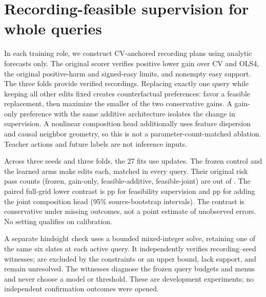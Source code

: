 \section{Recording-feasible supervision for whole queries}
In each training role, we construct CV-anchored recording plans using
analytic forecasts only. The original scorer verifies positive lower
gain over CV and OLS4, the original positive-harm and signed-easy
limits, and nonempty easy support. The three folds provide
\SlateWitnessWitnesses{} verified recordings. Replacing exactly one
query while keeping all other edits fixed creates counterfactual
preferences: favor a feasible replacement, then maximize the smaller
of the two conservative gains. A gain-only preference with the same
additive architecture isolates the change in supervision. A nonlinear
composition head additionally uses feature dispersion and causal
neighbor geometry, so this is not a parameter-count-matched ablation.
Teacher actions and future labels are not inference inputs.

Across three seeds and three folds, the 27 fits use
\SlateWitnessUpdates{} updates. The frozen control and the learned arms
make \SlateWitnessEdits{} edits each, matched in every query. Their
original risk pass counts (frozen, gain-only, feasible-additive,
feasible-joint) are \SlateWitnessPasses{} out of \SlateWitnessViews{}.
The paired full-grid lower contrast is \SlateWitnessFeasible{} pp for
feasibility supervision and \SlateWitnessJoint{} pp for adding the
joint composition head (95\% source-bootstrap intervals). The contrast
is conservative under missing outcomes, not a point estimate of
unobserved errors. No setting qualifies on calibration.

A separate hindsight check uses a bounded mixed-integer solve,
retaining one of the same six slates at
each active query. It independently verifies \SlateWitnessFixedVerified{}
recording--seed witnesses; \SlateWitnessFixedExcluded{} are excluded by
the constraints or an upper bound, \SlateWitnessFixedUnknown{} lack
support, and \SlateWitnessFixedUnresolved{} remain unresolved. The
witnesses diagnose the frozen query budgets and menus and never choose a
model or threshold. These are development experiments; no independent
confirmation outcomes were opened.

